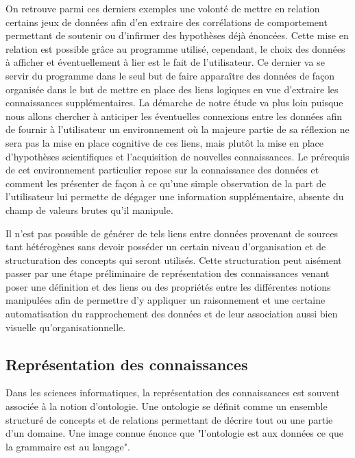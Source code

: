 On retrouve parmi ces derniers exemples une volonté de mettre en relation certains jeux de données afin d'en extraire des corrélations de comportement permettant de soutenir ou d'infirmer des hypothèses déjà énoncées. Cette mise en relation est possible grâce au programme utilisé, cependant, le choix des données à afficher et éventuellement à lier est le fait de l'utilisateur. Ce dernier va se servir du programme dans le seul but de faire apparaître des données de façon organisée dans le but de mettre en place des liens logiques en vue d'extraire les connaissances supplémentaires. La démarche de notre étude va plus loin puisque nous allons chercher à anticiper les éventuelles connexions entre les données afin de fournir à l'utilisateur un environnement où la majeure partie de sa réflexion ne sera pas la mise en place cognitive de ces liens, mais plutôt la mise en place d'hypothèses scientifiques et l'acquisition de nouvelles connaissances. Le prérequis de cet environnement particulier repose sur la connaissance des données et comment les présenter de façon à ce qu'une simple observation de la part de l'utilisateur lui permette de dégager une information supplémentaire, absente du champ de valeurs brutes qu'il manipule.

Il n'est pas possible de générer de tels liens entre données provenant de sources tant hétérogènes sans devoir posséder un certain niveau d'organisation et de structuration des concepts qui seront utilisés. Cette structuration peut aisément passer par une étape préliminaire de représentation des connaissances venant poser une définition et des liens ou des propriétés entre les différentes notions manipulées afin de permettre d'y appliquer un raisonnement et une certaine automatisation du rapprochement des données et de leur association aussi bien visuelle qu'organisationnelle.


\subsection{Représentation des connaissances}

Dans les sciences informatiques, la représentation des connaissances est souvent associée à la notion d'ontologie. Une ontologie se définit comme un ensemble structuré de concepts et de relations permettant de décrire tout ou une partie d'un domaine. Une image connue énonce que "l'ontologie est aux données ce que la grammaire est au langage".

